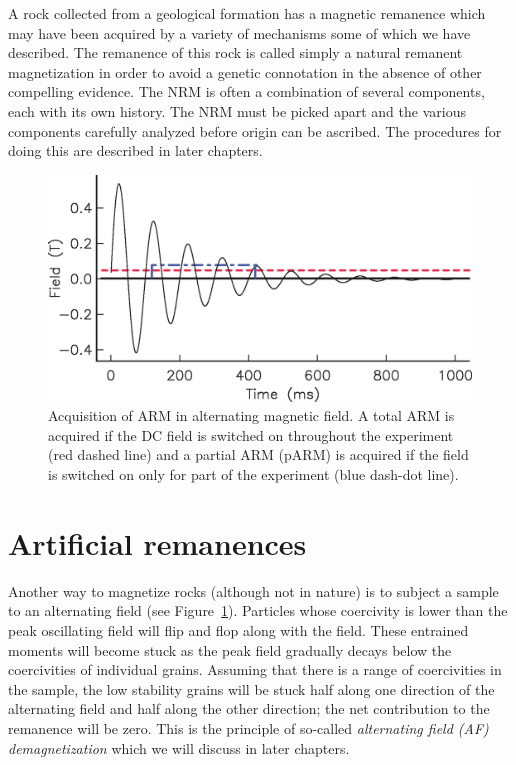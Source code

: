 A rock collected from a geological formation has a magnetic remanence which may have been
acquired by a variety of mechanisms some of which we have described.  The remanence of
this rock is called 
simply a 
 natural remanent magnetization  in order to avoid a
genetic connotation in the absence of other compelling evidence.  The NRM is often a
combination of several components, each with its own history.  The NRM must be picked
apart and the various components carefully 
analyzed before origin can be ascribed. The procedures for doing this
are described in later chapters.  


\begin{figure}[htb]
\centering  \includegraphics[width=9 cm]{EPSfiles/ARM.eps}
\caption{Acquisition of ARM in alternating magnetic field.  A total ARM is acquired if the DC field is switched on throughout the experiment (red dashed  line)  and a partial ARM (pARM) is acquired if the field is switched on only for part of the experiment (blue dash-dot line).  }
\label{fig:arm}
\end{figure}


\section{Artificial remanences }
\label{sect:arm}

Another way to magnetize rocks (although not in nature) is to subject a sample to 
an alternating field  (see Figure~\ref{fig:arm}).   Particles whose coercivity is lower than the peak oscillating field will flip and flop along with the field.   These entrained moments
will become stuck as the peak field gradually decays below the
coercivities of individual grains.   Assuming that there is a range of
coercivities in the sample, the low stability grains will be stuck half along
one direction of the alternating field and half along the other direction; the net
contribution to the remanence will be zero.  This is the principle of so-called
 {\it alternating field (AF) demagnetization} which we will discuss in later chapters.   


